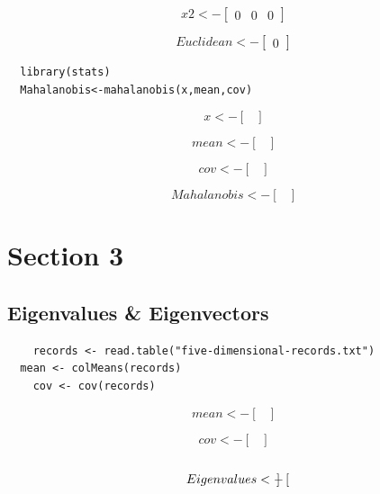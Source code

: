 \documentclass{report}
\begin{document}
\[
  x2 <-
  \begin{bmatrix}
    0 & 0 & 0
  \end{bmatrix}
\]

\[
  Euclidean <-
  \begin{bmatrix}
    0
  \end{bmatrix}
\]

\begin{verbatim}
  library(stats)
  Mahalanobis<-mahalanobis(x,mean,cov) 
\end{verbatim}

\[
  x <-
  \begin{bmatrix}
  \end{bmatrix}
\]

\[
  mean <-
  \begin{bmatrix}
  \end{bmatrix}
\]

\[
  cov <-
  \begin{bmatrix}
  \end{bmatrix}
\]

\[
  Mahalanobis <-
  \begin{bmatrix}
  \end{bmatrix}
\]



\chapter{Section 3}

\section{Eigenvalues \& Eigenvectors}

\begin{verbatim}
	records <- read.table("five-dimensional-records.txt")
  mean <- colMeans(records)
	cov <- cov(records)
\end{verbatim}

\[
  mean <- 
  \begin{bmatrix}
  \end{bmatrix}
\]

\[
  cov <- 
  \begin{bmatrix}
  \end{bmatrix}
\]

\begin{verbatim}
\end{verbatim}

\[
  Eigenvalues <- 
  \begin{bmatrix}
  \end{bmatrix} \\
\]
\end{document}
